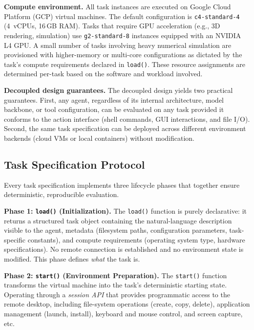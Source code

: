 \documentclass{llmxive}
\begin{document}
\noindent \textbf{Compute environment.}
All task instances are executed on Google Cloud Platform (GCP) virtual machines. The default configuration is \texttt{c4-standard-4} (4~vCPUs, 16\,GB RAM). Tasks that require GPU acceleration (e.g., 3D rendering, simulation) use \texttt{g2-standard-8} instances equipped with an NVIDIA L4 GPU. A small number of tasks involving heavy numerical simulation are provisioned with higher-memory or multi-core configurations as dictated by the task's compute requirements declared in \texttt{load()}. These resource assignments are determined per-task based on the software and workload involved.

\noindent \textbf{Decoupled design guarantees.}
The decoupled design yields two practical guarantees. First, any agent, regardless of its internal architecture, model backbone, or tool configuration, can be evaluated on any task provided it conforms to the action interface (shell commands, GUI interactions, and file I/O). Second, the same task specification can be deployed across different environment backends (cloud VMs or local containers) without modification.

\subsection{Task Specification Protocol}
\label{app:task-spec-protocol}

Every task specification implements three lifecycle phases that together ensure deterministic, reproducible evaluation.

\noindent \textbf{Phase 1: \texttt{load()} (Initialization).}
The \texttt{load()} function is purely declarative: it returns a structured task object containing the natural-language description visible to the agent, metadata (filesystem paths, configuration parameters, task-specific constants), and compute requirements (operating system type, hardware specifications). No remote connection is established and no environment state is modified. This phase defines \emph{what} the task is.

\noindent \textbf{Phase 2: \texttt{start()} (Environment Preparation).}
The \texttt{start()} function transforms the virtual machine into the task's deterministic starting state. Operating through a \emph{session API} that provides programmatic access to the remote desktop, including file-system operations (create, copy, delete), application management (launch, install), keyboard and mouse control, and screen capture, etc.
\end{document}
